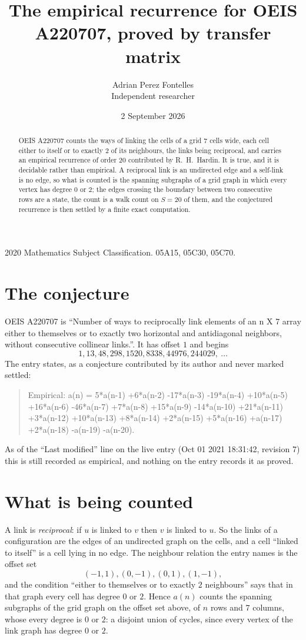 \documentclass[11pt,a4paper]{article}
\title{The empirical recurrence for OEIS A220707, proved by transfer matrix}
\author{Adrian Perez Fontelles\\ \small Independent researcher}
\date{2 September 2026}
\theoremstyle{plain}
\theoremstyle{definition}
\begin{document}
\maketitle

\begin{abstract}
OEIS A220707 counts the ways of linking the cells of a grid $7$ cells wide, each cell either to
itself or to exactly $2$ of its neighbours, the links being reciprocal, and carries an
empirical recurrence of order $20$ contributed by R.~H.~Hardin. It is true, and it is
decidable rather than empirical. A reciprocal link is an undirected edge and a self-link is
no edge, so what is counted is the spanning subgraphs of a grid graph in which every vertex
has degree $0$ or $2$; the edges crossing the boundary between two consecutive rows are a
state, the count is a walk count on $S=20$ of them, and the conjectured recurrence is then
settled by a finite exact computation.
\end{abstract}

\noindent\small 2020 Mathematics Subject Classification. 05A15, 05C30, 05C70.\normalsize

\section{The conjecture}

OEIS A220707 is ``Number of ways to reciprocally link elements of an n X 7 array either to themselves or to exactly two horizontal and antidiagonal neighbors, without consecutive collinear links.''. It has offset $1$ and begins
\[
1, 13, 48, 298, 1520, 8338, 44976, 244029,\ \dots
\]
The entry states, as a conjecture contributed by its author and never marked settled:
\begin{quote}
Empirical: a(n) = 5*a(n-1) +6*a(n-2) -17*a(n-3) -19*a(n-4) +10*a(n-5) +16*a(n-6) -46*a(n-7) +7*a(n-8) +15*a(n-9) -14*a(n-10) +21*a(n-11) +3*a(n-12) +10*a(n-13) +8*a(n-14) +2*a(n-15) +5*a(n-16) +a(n-17) +2*a(n-18) -a(n-19) -a(n-20).
\end{quote}
As of the ``Last modified'' line on the live entry (Oct 01 2021 18:31:42, revision 7) this is still
recorded as empirical, and nothing on the entry records it as proved.

\section{What is being counted}

A link is \emph{reciprocal}: if $u$ is linked to $v$ then $v$ is linked to $u$. So the links
of a configuration are the edges of an undirected graph on the cells, and a cell ``linked to
itself'' is a cell lying in no edge. The neighbour relation the entry names is the offset set
\[
(-1,1), (0,-1), (0,1), (1,-1),
\]
and the condition ``either to themselves or to exactly $2$ neighbours'' says that in that
graph every cell has degree $0$ or $2$. Hence $a(n)$ counts the spanning subgraphs of the
grid graph on the offset set above, of $n$ rows and $7$ columns,
whose every degree is $0$ or $2$: a disjoint union of cycles, since every vertex of the link graph has degree $0$ or $2$.
\end{document}
